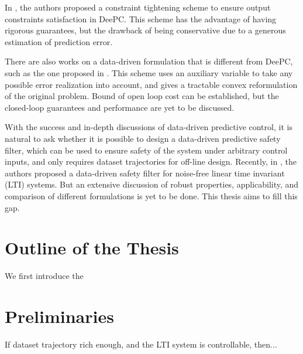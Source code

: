 In \cite{berberich_data-driven-robust_2021}, the authors proposed a constraint tightening scheme to ensure output constraints satisfaction in DeePC.
This scheme has the advantage of having rigorous guarantees, but the drawback of being conservative due to a generous estimation of prediction error.

There are also works on a data-driven formulation that is different from DeePC, such as the one proposed in \cite{huang_robust_2023}.
This scheme uses an auxiliary variable to take any possible error realization into account, and gives a tractable convex reformulation of the original problem.
Bound of open loop cost can be established, but the closed-loop guarantees  and performance are yet to be discussed.

With the success and in-depth discussions of data-driven predictive control, it is natural to ask whether it is possible to design a data-driven predictive safety filter, which can be used to ensure safety of the system under arbitrary control inputs, and only requires dataset trajectories for off-line design.
Recently, in \cite{bajelani_data-driven_2023}, the authors proposed a data-driven safety filter for noise-free linear time invariant (LTI) systems.
But an extensive discussion of robust properties, applicability, and comparison of different formulations is yet to be done.
This thesis aims to fill this gap.


\section{Outline of the Thesis}\label{sec:outline-of-the-thesis}
We first introduce the 


\section{Preliminaries}\label{sec:preliminaries}

\begin{lemma}\label{lemma:fundamental-lemma}
    If dataset trajectory rich enough, and the LTI system is controllable, then...
\end{lemma}

